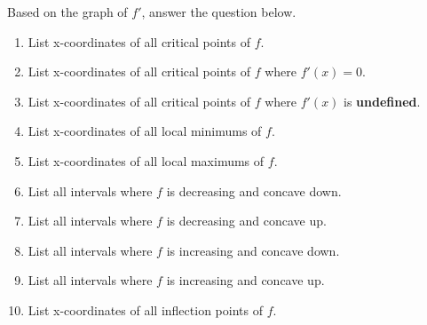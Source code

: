 \documentclass{ximera}
\begin{document}
\begin{problem}
	Based on the graph of $f'$, answer  the question below.\\
	\begin{enumerate}
		\item List x-coordinates of all critical points of $f$.
		\item List x-coordinates of all critical points of $f$ where $f'(x)=0$.\\ 
		\item List x-coordinates of all critical points of $f$ where $f'(x)$ is \textbf{undefined}.
		\item List x-coordinates of all local minimums of $f$. 
		\item List x-coordinates of all local maximums of $f$. 
		\item List all intervals where $f$ is decreasing and concave down.
		\item List all intervals where $f$ is decreasing and concave up.
		\item List all intervals where $f$ is increasing and concave down.
		\item List all intervals where $f$ is increasing and concave up.
		\item List x-coordinates of all inflection points of $f$. 
		\end{enumerate}

\end{problem}
\end{document}
